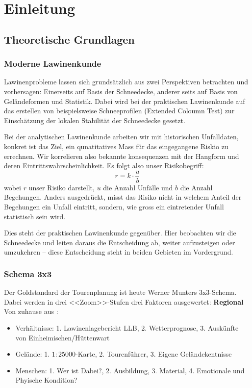 \section{Einleitung}
\subsection{Theoretische Grundlagen}
\subsubsection{Moderne Lawinenkunde}
Lawinenprobleme lassen sich grundsätzlich aus zwei Perspektiven betrachten und vorhersagen: Einerseits auf Basis der Schneedecke, anderer seits auf Basis von Geländeformen und Statistik.
Dabei wird bei der praktischen Lawinenkunde auf das erstellen von beispielsweise Schneeprofilen (Extended Coloumn Test) zur Einschätzung der lokalen Stabilität der Schneedecke gesetzt.

Bei der analytischen Lawinenkunde arbeiten wir mit historischen Unfalldaten, konkret ist das Ziel, ein qunatitatives Mass für das eingegangene Riskio zu errechnen.
Wir korrelieren also bekannte konsequenzen mit der Hangform und deren Eintrittswahrscheinlichkeit. Es folgt also unser Risikobegriff:
\begin{equation}
  r = k \cdot \frac{u}{b}
\end{equation}
wobei $r$ unser Risiko darstellt, $u$ die Anzahl Unfälle und $b$ die Anzahl Begehungen.
Anders ausgedrückt, misst das Risiko nicht in welchem Anteil der Begehungen ein Unfall eintritt, sondern, wie gross ein eintretender Unfall statistisch sein wird.

Dies steht der praktischen Lawinenkunde gegenüber. Hier beobachten wir die Schneedecke und leiten daraus die Entscheidung ab, weiter aufzusteigen oder umzukehren – diese Entscheidung steht in beiden Gebieten im Vordergrund.
\columnbreak
\subsubsection{Schema 3x3}
Der Goldstandard der Tourenplanung ist heute Werner Munters 3x3-Schema. Dabei werden in drei <<Zoom>>-Stufen drei Faktoren ausgewertet:
\vfill
\textbf{Regional} 
Von zuhause aus \cite{munter}:
\begin{itemize}
  \item Verhältnisse: 1. Lawinenlagebericht LLB, 2. Wetterprognose, 3. Auskünfte von Einheimischen/Hüttenwart
  \item Gelände: 1. $1:25000$-Karte, 2. Tourenführer, 3. Eigene Geländekentnisse
  \item Menschen: 1. Wer ist Dabei?, 2. Ausbildung, 3. Material, 4. Emotionale und Phyische Kondition? 
\end{itemize}

